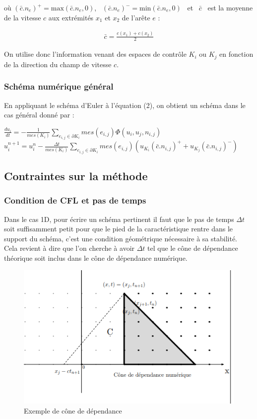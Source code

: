 \documentclass[12pt]{article}
\begin{document}
\noindent où $(\bar c.n_e)^+=\text{max}(\bar c.n_e,0)$, \, $(\bar c.n_e)^-=\text{min}(\bar c.n_e,0)$ \, et \, $\bar c$ \, est la moyenne de la vitesse $c$ aux extrémités $x_1$ et $x_2$ de l'arête $e$ :

\begin{eqnarray*}
       \bar c=\frac{c(x_1)+c(x_2)}{2}
\end{eqnarray*}

\noindent On utilise donc l'information venant des espaces de contrôle $K_i$ ou $K_j$ en fonction de la direction du champ de vitesse $c$.

\subsubsection{Schéma numérique général}
\noindent En appliquant le schéma d'Euler \cite{ref6} à l'équation (2), on obtient un schéma dans le cas général donné par :
\begin{center}
       $\displaystyle \frac{d u_i}{dt}=-\frac{1}{mes(K_i)} \displaystyle\sum_{e_{i,j} \in \partial K_i} mes(e_{i,j})\Phi(u_i,u_j,n_{i,j})$
       \\
       $u_i^{n+1}=u_i^n-\frac{\Delta t}{mes(K_i)} \displaystyle\sum_{e_{i,j}\in \partial K_i} mes(e_{i,j}) (u_{K_i}(\bar c.n_{i,j})^+ + u_{K_j}(\bar c.n_{i,j})^-)$
\end{center}
 
 \subsection{Contraintes sur la méthode}
 \subsubsection{Condition de CFL et pas de temps}
\noindent Dans le cas 1D, pour écrire un schéma pertinent il faut que le pas de temps $\Delta t$ soit suffisamment petit pour que le pied de la caractéristique rentre dans le support du schéma, c'est une condition géométrique nécessaire à sa stabilité.
 \\Cela revient à dire que l'on cherche à avoir $\Delta t$ tel que le cône de dépendance théorique soit inclus dans le cône de dépendance numérique.
 
 \begin{figure}[H]
	\centering
	\includegraphics[scale=0.7]{cone.png}
	\caption{Exemple de cône de dépendance}
	\label{1D}
	\end{figure}
	
\end{document}
